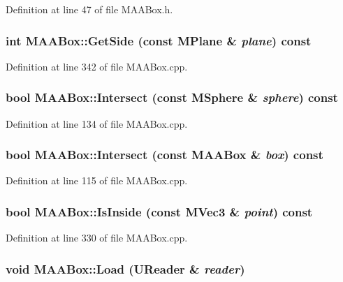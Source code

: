 Definition at line 47 of file MAABox.h.\hypertarget{class_m_a_a_box_0948818103883ba996a23c8e26f8a2a5}{
\subsubsection[{GetSide}]{\setlength{\rightskip}{0pt plus 5cm}int MAABox::GetSide (const {\bf MPlane} \& {\em plane}) const}}
\label{class_m_a_a_box_0948818103883ba996a23c8e26f8a2a5}




Definition at line 342 of file MAABox.cpp.\hypertarget{class_m_a_a_box_8b16f4be06c18802ebed0029ff215d5d}{
\subsubsection[{Intersect}]{\setlength{\rightskip}{0pt plus 5cm}bool MAABox::Intersect (const {\bf MSphere} \& {\em sphere}) const}}
\label{class_m_a_a_box_8b16f4be06c18802ebed0029ff215d5d}




Definition at line 134 of file MAABox.cpp.\hypertarget{class_m_a_a_box_b309a32c61158e79a35b19a339d05248}{
\subsubsection[{Intersect}]{\setlength{\rightskip}{0pt plus 5cm}bool MAABox::Intersect (const {\bf MAABox} \& {\em box}) const}}
\label{class_m_a_a_box_b309a32c61158e79a35b19a339d05248}




Definition at line 115 of file MAABox.cpp.\hypertarget{class_m_a_a_box_0531f288d3c7a6d0a2c9f90cf72a6668}{
\subsubsection[{IsInside}]{\setlength{\rightskip}{0pt plus 5cm}bool MAABox::IsInside (const {\bf MVec3} \& {\em point}) const}}
\label{class_m_a_a_box_0531f288d3c7a6d0a2c9f90cf72a6668}




Definition at line 330 of file MAABox.cpp.\hypertarget{class_m_a_a_box_7658fd191ee1fbbf3d6f93d0221fe13a}{
\subsubsection[{Load}]{\setlength{\rightskip}{0pt plus 5cm}void MAABox::Load ({\bf UReader} \& {\em reader})}}
\label{class_m_a_a_box_7658fd191ee1fbbf3d6f93d0221fe13a}




